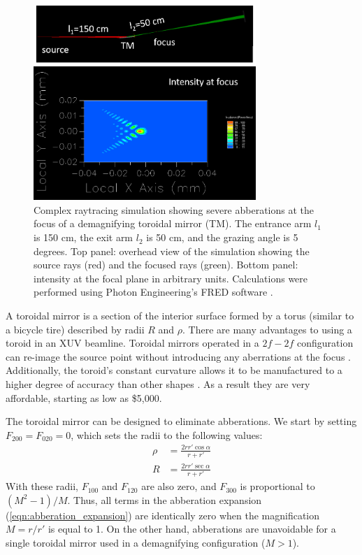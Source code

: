 \begin{figure}
	\centering
	\includegraphics[width=0.75\textwidth]{figures/chap2/TM_coma.png}
	\caption{Complex raytracing simulation showing severe abberations at the focus of a demagnifying toroidal mirror (TM). The entrance arm $l_1$ is 150 cm, the exit arm $l_2$ is 50 cm, and the grazing angle is 5 degrees. Top panel: overhead view of the simulation showing the source rays (red) and the focused rays (green). Bottom panel: intensity at the focal plane in arbitrary units. Calculations were performed using Photon Engineering's FRED software \cite{FREDOpticalEngineering}.}
	\label{fig:TM_coma}
\end{figure}

A toroidal mirror is a section of the interior surface formed by a torus (similar to a bicycle tire) described by radii $R$ and $\rho$. There are many advantages to using a toroid in an XUV beamline. Toroidal mirrors operated in a $2f-2f$ configuration can re-image the source point without introducing any aberrations at the focus \cite{chirlaAttosecondPulseGeneration2011}. Additionally, the toroid's constant curvature allows it to be manufactured to a higher degree of accuracy than other shapes \cite{howellsMirrorsSynchrotronRadiationBeamlines1994}. As a result they are very affordable, starting as low as \$5,000.

The toroidal mirror can be designed to eliminate abberations. We start by setting $F_{200} = F_{020} = 0$, which sets the radii to the following values:
\begin{align}
\rho &= \frac{2 r r' \cos \alpha}{r + r'} \\
R &= \frac{2 r r' \sec \alpha}{r+r'}
\end{align} 
With these radii, $F_{100}$ and $F_{120}$ are also zero, and $F_{300}$ is proportional to $(M^2-1)/M$. Thus, all terms in the abberation expansion (\cref{eqn:abberation_expansion}) are identically zero when the magnification $M = r/r'$ is equal to 1. On the other hand, abberations are unavoidable for a single toroidal mirror used in a demagnifying configuration ($M>1$).

